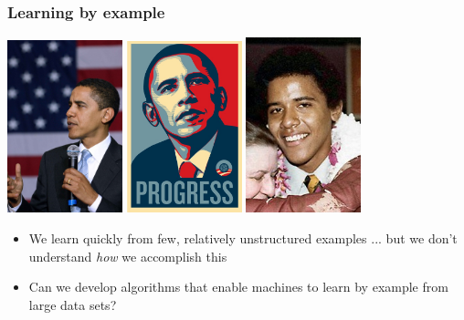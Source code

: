 \begin{frame}
  \frametitle{Learning by example}

    \begin{center}
      \includegraphics[width=0.25\textwidth]{obama1.png}
      \includegraphics[width=0.25\textwidth]{obama2.png}
      \includegraphics[width=0.25\textwidth]{obama4.png}
    \end{center}

    \begin{itemize}
      \pause
      \item We learn quickly from few, relatively unstructured examples
       ... but we don't understand {\it how} we accomplish this
      \item \alert<2>{Can we develop algorithms that enable machines
        to learn by example from large data sets?}
    \end{itemize}

\end{frame}

